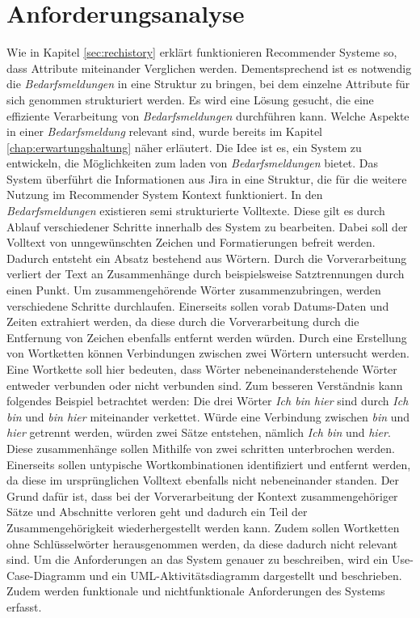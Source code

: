 \section{Anforderungsanalyse}
\label{sec:anforderungsanalyse}
Wie in Kapitel \ref{sec:rechistory} erklärt funktionieren Recommender Systeme so, dass Attribute miteinander Verglichen werden. Dementsprechend ist es notwendig die \emph{Bedarfsmeldungen} in eine Struktur zu bringen, bei dem einzelne Attribute für sich genommen strukturiert werden. Es wird eine Lösung gesucht, die eine effiziente Verarbeitung von \emph{Bedarfsmeldungen} durchführen kann. Welche Aspekte in einer \emph{Bedarfsmeldung} relevant sind, wurde bereits im Kapitel \ref{chap:erwartungshaltung} näher erläutert. Die Idee ist es, ein System zu entwickeln, die Möglichkeiten zum laden von \emph{Bedarfsmeldungen} bietet. Das System überführt die Informationen aus Jira in eine Struktur, die für die weitere Nutzung im Recommender System Kontext funktioniert. In den \emph{Bedarfsmeldungen} existieren semi strukturierte Volltexte. Diese gilt es durch Ablauf verschiedener Schritte innerhalb des System zu bearbeiten. Dabei soll der Volltext von unngewünschten Zeichen und Formatierungen befreit werden. Dadurch entsteht ein Absatz bestehend aus Wörtern. Durch die Vorverarbeitung verliert der Text an Zusammenhänge durch beispielsweise Satztrennungen durch einen Punkt. Um zusammengehörende Wörter zusammenzubringen, werden verschiedene Schritte durchlaufen. Einerseits sollen vorab Datums-Daten und Zeiten extrahiert werden, da diese durch die Vorverarbeitung durch die Entfernung von Zeichen ebenfalls entfernt werden würden. Durch eine Erstellung von Wortketten können Verbindungen zwischen zwei Wörtern untersucht werden. Eine Wortkette soll hier bedeuten, dass Wörter nebeneinanderstehende Wörter entweder verbunden oder nicht verbunden sind. Zum besseren Verständnis kann folgendes Beispiel betrachtet werden: Die drei Wörter \emph{Ich bin hier} sind durch \emph{Ich bin} und \emph{bin hier} miteinander verkettet. Würde eine Verbindung zwischen \emph{bin} und \emph{hier} getrennt werden, würden zwei Sätze entstehen, nämlich \emph{Ich bin} und \emph{hier}. Diese zusammenhänge sollen Mithilfe von zwei schritten unterbrochen werden. Einerseits sollen untypische Wortkombinationen identifiziert und entfernt werden, da diese im ursprünglichen Volltext ebenfalls nicht nebeneinander standen. Der Grund dafür ist, dass bei der Vorverarbeitung der Kontext zusammengehöriger Sätze und Abschnitte verloren geht und dadurch ein Teil der Zusammengehörigkeit wiederhergestellt werden kann. Zudem sollen Wortketten ohne Schlüsselwörter herausgenommen werden, da diese dadurch nicht relevant sind. Um die Anforderungen an das System genauer zu beschreiben, wird ein Use-Case-Diagramm und ein UML-Aktivitätsdiagramm dargestellt und beschrieben. Zudem werden funktionale und nichtfunktionale Anforderungen des Systems erfasst.
